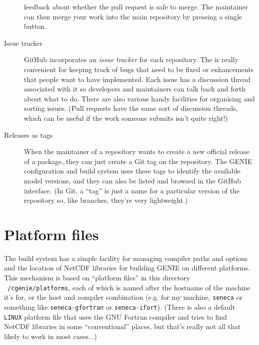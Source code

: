 \documentclass[a4paper,10pt,article]{memoir}
\begin{document}
\begin{description}
{    feedback about whether the pull request is safe to merge.  The
    maintainer can then merge your work into the main repository by
    pressing a single button.}
  \item[Issue tracker]{GitHub incorporates an \emph{issue tracker} for
    each repository.  The is really convenient for keeping track of
    bugs that need to be fixed or enhancements that people want to
    have implemented.  Each issue has a discussion thread associated
    with it so developers and maintainers can talk back and forth
    about what to do.  There are also various handy facilities for
    organising and sorting issues.  (Pull requests have the same sort
    of discussion threads, which can be useful if the work someone
    submits isn't quite right!)}
  \item[Releases as tags]{When the maintainer of a repository wants to
    create a new official release of a package, they can just create a
    Git tag on the repository.  The GENIE configuration and build
    system uses these tags to identify the available model versions,
    and they can also be listed and browsed in the GitHub interface.
    (In Git, a ``tag'' is just a name for a particular version of the
    repository so, like branches, they're very lightweight.)}
\end{description}

\section{Platform files}
\label{sec:platforms}

The build system has a simple facility for managing compiler paths and
options and the location of NetCDF libraries for building GENIE on
different platforms.  This mechanism is based on ``platform files'' in
this directory \texttt{~/cgenie/platforms}, each of which is named
after the hostname of the machine it's for, or the host and compiler
combination (e.g. for my machine, \texttt{seneca} or something like
\texttt{seneca-gfortran} or \texttt{seneca-ifort}).  (There is also a
default \texttt{LINUX} platform file that uses the GNU Fortran
compiler and tries to find NetCDF libraries in some ``conventional''
places, but that's really not all that likely to work in most
cases...)
\end{document}
